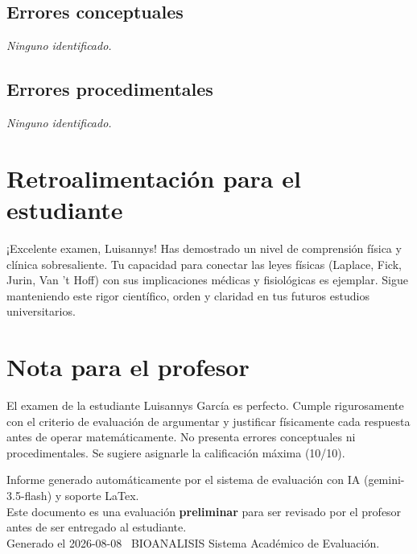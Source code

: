 \documentclass[11pt,a4paper]{article}
\begin{document}
\subsection*{Errores conceptuales}
\textit{Ninguno identificado.}

\subsection*{Errores procedimentales}
\textit{Ninguno identificado.}

\section*{Retroalimentación para el estudiante}
\begin{tcolorbox}[cajaRecomendacion, title={Dirigido a: Luisannys Garcia}]
¡Excelente examen, Luisannys! Has demostrado un nivel de comprensión física y clínica sobresaliente. Tu capacidad para conectar las leyes físicas (Laplace, Fick, Jurin, Van 't Hoff) con sus implicaciones médicas y fisiológicas es ejemplar. Sigue manteniendo este rigor científico, orden y claridad en tus futuros estudios universitarios.
\end{tcolorbox}

\section*{Nota para el profesor}
\begin{tcolorbox}[
  enhanced, breakable,
  colback=yellow!8, colframe=yellow!60!black,
  fonttitle=\bfseries, coltitle=black,
  title={Observaciones para revisión manual},
  top=4pt, bottom=4pt, left=8pt, right=8pt,
]
El examen de la estudiante Luisannys García es perfecto. Cumple rigurosamente con el criterio de evaluación de argumentar y justificar físicamente cada respuesta antes de operar matemáticamente. No presenta errores conceptuales ni procedimentales. Se sugiere asignarle la calificación máxima (10/10).
\end{tcolorbox}

\vspace{12pt}
\begin{center}
  \footnotesize\color{gray}
  Informe generado automáticamente por el sistema de evaluación con IA (gemini-3.5-flash) y soporte LaTex. \\
  Este documento es una evaluación \textbf{preliminar} para ser revisado por el profesor antes de ser entregado al 
  estudiante. \\
  Generado el 2026-08-08 \textbullet\ BIOANALISIS Sistema Académico de Evaluación.
  \end{center}
\end{document}
